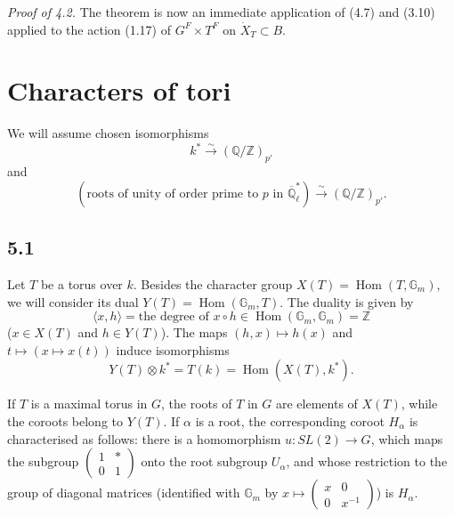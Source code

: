 \documentclass[11pt]{amsart}
\theoremstyle{plain}
\theoremstyle{remark}
\DeclareMathOperator{\Hom}{Hom}
\begin{document}
\textit{Proof of 4.2.} The theorem is now an immediate application of (4.7) and (3.10) applied to the action (1.17) of $G^F \times T^F$ on $\dot{X}_T \subset B$.

\section{Characters of tori}

We will assume chosen isomorphisms
\begin{equation}\label{eq:5.0.1}
k^* \xrightarrow{\sim} (\mathbb{Q}/\mathbb{Z})_{p'}
\end{equation}
and
\begin{equation}\label{eq:5.0.2}
(\text{roots of unity of order prime to }p\text{ in }\overline{\mathbb{Q}}_\ell^*) \xrightarrow{\sim} (\mathbb{Q}/\mathbb{Z})_{p'}.
\end{equation}

\subsection{5.1} Let $T$ be a torus over $k$. Besides the character group $X(T) = \Hom(T, \mathbb{G}_m)$, we will consider its dual $Y(T) = \Hom(\mathbb{G}_m, T)$. The duality is given by
\[
\langle x, h \rangle = \text{the degree of }x \circ h \in \Hom(\mathbb{G}_m, \mathbb{G}_m) = \mathbb{Z}
\]
($x \in X(T)$ and $h \in Y(T)$). The maps $(h, x) \mapsto h(x)$ and $t \mapsto (x \mapsto x(t))$ induce isomorphisms
\begin{equation}\label{eq:5.1.1}
Y(T) \otimes k^* = T(k) = \Hom(X(T), k^*).
\end{equation}

If $T$ is a maximal torus in $G$, the roots of $T$ in $G$ are elements of $X(T)$, while the coroots belong to $Y(T)$. If $\alpha$ is a root, the corresponding coroot $H_\alpha$ is characterised as follows: there is a homomorphism $u: SL(2) \to G$, which maps the subgroup $\begin{pmatrix} 1 & * \\ 0 & 1 \end{pmatrix}$ onto the root subgroup $U_\alpha$, and whose restriction to the group of diagonal matrices (identified with $\mathbb{G}_m$ by $x \mapsto \begin{pmatrix} x & 0 \\ 0 & x^{-1} \end{pmatrix}$) is $H_\alpha$.
\end{document}
